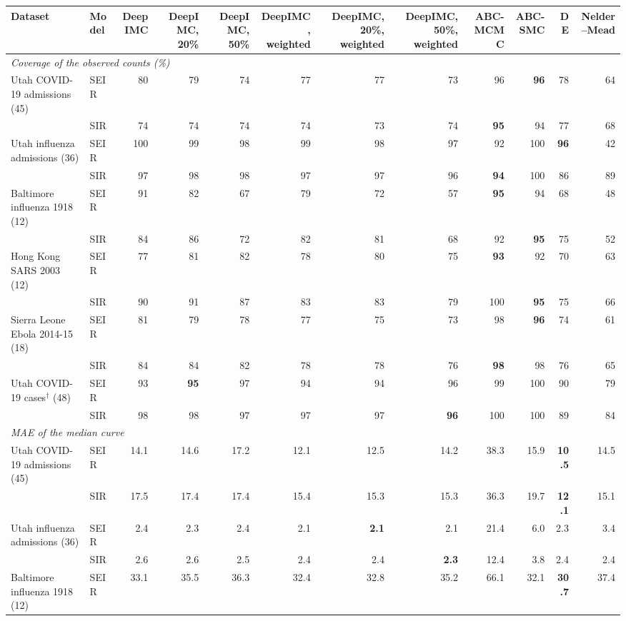 \begin{tabular}{llrrrrrrrrrr}
\toprule
Dataset & Model & DeepIMC & DeepIMC, 20\% & DeepIMC, 50\% & DeepIMC, weighted & DeepIMC, 20\%, weighted & DeepIMC, 50\%, weighted & ABC-MCMC & ABC-SMC & DE & Nelder--Mead \\
\midrule
\multicolumn{12}{l}{\textit{Coverage of the observed counts (\%)}} \\
Utah COVID-19 admissions (45) & SEIR & 80 & 79 & 74 & 77 & 77 & 73 & 96 & \textbf{96} & 78 & 64 \\
 & SIR & 74 & 74 & 74 & 74 & 73 & 74 & \textbf{95} & 94 & 77 & 68 \\
Utah influenza admissions (36) & SEIR & 100 & 99 & 98 & 99 & 98 & 97 & 92 & 100 & \textbf{96} & 42 \\
 & SIR & 97 & 98 & 98 & 97 & 97 & 96 & \textbf{94} & 100 & 86 & 89 \\
Baltimore influenza 1918 (12) & SEIR & 91 & 82 & 67 & 79 & 72 & 57 & \textbf{95} & 94 & 68 & 48 \\
 & SIR & 84 & 86 & 72 & 82 & 81 & 68 & 92 & \textbf{95} & 75 & 52 \\
Hong Kong SARS 2003 (12) & SEIR & 77 & 81 & 82 & 78 & 80 & 75 & \textbf{93} & 92 & 70 & 63 \\
 & SIR & 90 & 91 & 87 & 83 & 83 & 79 & 100 & \textbf{95} & 75 & 66 \\
Sierra Leone Ebola 2014-15 (18) & SEIR & 81 & 79 & 78 & 77 & 75 & 73 & 98 & \textbf{96} & 74 & 61 \\
 & SIR & 84 & 84 & 82 & 78 & 78 & 76 & \textbf{98} & 98 & 76 & 65 \\
Utah COVID-19 cases$^\dagger$ (48) & SEIR & 93 & \textbf{95} & 97 & 94 & 94 & 96 & 99 & 100 & 90 & 79 \\
 & SIR & 98 & 98 & 97 & 97 & 97 & \textbf{96} & 100 & 100 & 89 & 84 \\
\midrule
\multicolumn{12}{l}{\textit{MAE of the median curve}} \\
Utah COVID-19 admissions (45) & SEIR & 14.1 & 14.6 & 17.2 & 12.1 & 12.5 & 14.2 & 38.3 & 15.9 & \textbf{10.5} & 14.5 \\
 & SIR & 17.5 & 17.4 & 17.4 & 15.4 & 15.3 & 15.3 & 36.3 & 19.7 & \textbf{12.1} & 15.1 \\
Utah influenza admissions (36) & SEIR & 2.4 & 2.3 & 2.4 & 2.1 & \textbf{2.1} & 2.1 & 21.4 & 6.0 & 2.3 & 3.4 \\
 & SIR & 2.6 & 2.6 & 2.5 & 2.4 & 2.4 & \textbf{2.3} & 12.4 & 3.8 & 2.4 & 2.4 \\
Baltimore influenza 1918 (12) & SEIR & 33.1 & 35.5 & 36.3 & 32.4 & 32.8 & 35.2 & 66.1 & 32.1 & \textbf{30.7} & 37.4 \\

\end{tabular}
